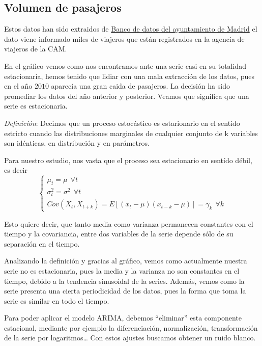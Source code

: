 \documentclass[11pt]{article}
\begin{document}
    \hypertarget{volumen-de-pasajeros}{%
\subsection{Volumen de pasajeros}\label{volumen-de-pasajeros}}

    Estos datos han sido extraidos de
\href{http://www-2.munimadrid.es/CSE6/control/seleccionDatos?numSerie=15050100012}{Banco
de datos del ayuntamiento de Madrid} el dato viene informado miles de
viajeros que están registrados en la agencia de viajeros de la CAM.

    En el gráfico vemos como nos encontramos ante una serie casi en su
totalidad estacionaria, hemos tenido que lidiar con una mala extracción
de los datos, pues en el año \(2010\) aparecía una gran caida de
pasajeros. La decisión ha sido promediar los datos del año anterior y
posterior. Veamos que significa que una serie es estacionaria.

\emph{Definición}: Decimos que un proceso estocástico es estarionario en
el sentido estricto cuando las distribuciones marginales de cualquier
conjunto de k variables son idénticas, en distribución y en parámetros.

Para nuestro estudio, nos vasta que el proceso sea estacionario en
sentído débil, es decir
\[ \left\lbrace\begin{array}{l} \mu_t = \mu \ \ \forall t \\ \sigma_t^2 = \sigma^2 \ \ \forall t \\ Cov(X_t,X_{t+k}) = E[(x_t - \mu )(x_{t-k} - \mu)] = \gamma_k \ \ \forall k \end{array}\right.{ } \]

Esto quiere decir, que tanto media como varianza permanecen constantes
con el tiempo y la covariancia, entre dos variables de la serie depende
sólo de su separación en el tiempo.

    Analizando la definición y gracias al gráfico, vemos como actualmente
nuestra serie no es estacionaria, pues la media y la varianza no son
constantes en el tiempo, debido a la tendencia sinusoidal de la series.
Además, vemos como la serie presenta una cierta periodicidad de los
datos, pues la forma que toma la serie es similar en todo el tiempo.

    Para poder aplicar el modelo ARIMA, debemos ``eliminar'' esta componente
estacional, mediante por ejemplo la diferenciación, normalización,
transformación de la serie por logaritmos\ldots{} Con estos ajustes
buscamos obtener un ruido blanco.
\end{document}
